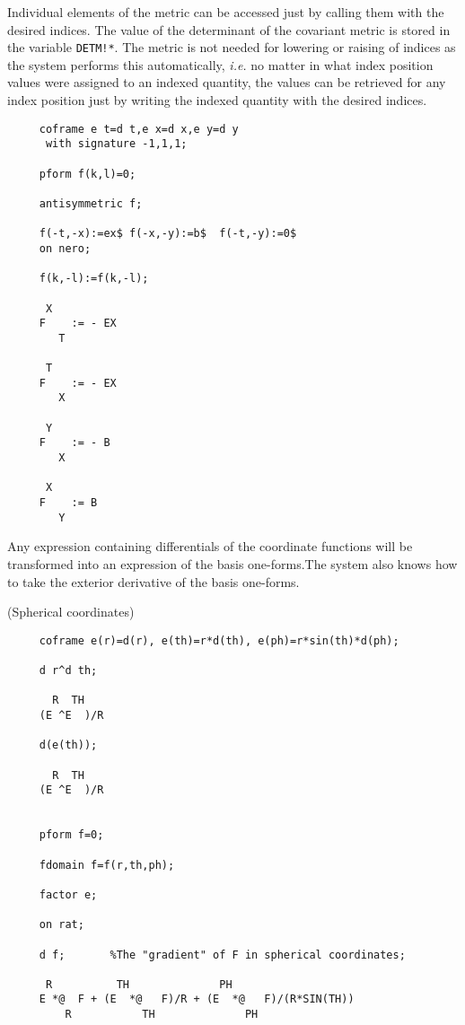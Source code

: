 Individual elements of the metric can be accessed just by calling them
with the desired indices. The value of the determinant of the
 
covariant metric is stored in the variable {\tt DETM!*}.  The metric
is not needed for lowering or raising of indices as the system
performs this automatically, {\em i.e.} no matter in what index
position values were assigned to an indexed quantity, the values can
be retrieved for any index position just by writing the indexed
quantity with the desired indices.

\example{}

\begin{verbatim}
     coframe e t=d t,e x=d x,e y=d y
      with signature -1,1,1;

     pform f(k,l)=0;

     antisymmetric f;

     f(-t,-x):=ex$ f(-x,-y):=b$  f(-t,-y):=0$
     on nero;

     f(k,-l):=f(k,-l);

      X
     F    := - EX
        T

      T
     F    := - EX
        X

      Y
     F    := - B
        X

      X
     F    := B
        Y
\end{verbatim}

Any expression containing differentials of the coordinate functions will
be transformed into an expression of the basis one-forms.The system also
knows how to take the exterior derivative of the basis one-forms.

\example (Spherical coordinates)

\begin{verbatim}
     coframe e(r)=d(r), e(th)=r*d(th), e(ph)=r*sin(th)*d(ph);

     d r^d th;

       R  TH
     (E ^E  )/R

     d(e(th));

       R  TH
     (E ^E  )/R


     pform f=0;

     fdomain f=f(r,th,ph);

     factor e;

     on rat;

     d f;       %The "gradient" of F in spherical coordinates;

      R          TH              PH
     E *@  F + (E  *@   F)/R + (E  *@   F)/(R*SIN(TH))
         R           TH              PH
\end{verbatim}

